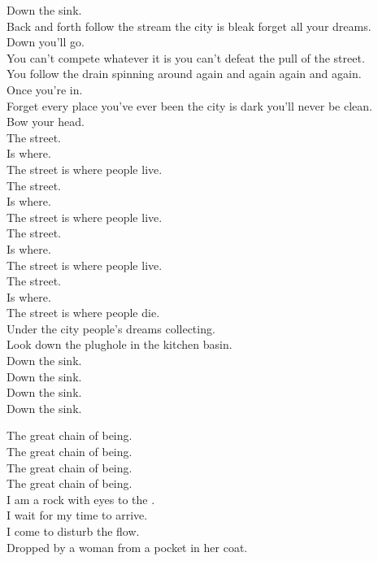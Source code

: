 Down the sink. \\
Back and forth follow the stream the city is bleak forget all your dreams. \\
Down you'll go. \\
You can't compete whatever it is you can't defeat the pull of the street. \\
You follow the drain spinning around again and again again and again. \\
Once you're in. \\
Forget every place you've ever been the city is dark you'll never be clean. \\
Bow your head. \\

The street. \\
Is where. \\
The street is where people live. \\
The street. \\
Is where. \\
The street is where people live. \\
The street. \\
Is where. \\
The street is where people live. \\
The street. \\
Is where. \\
The street is where people die. \\

Under the city people's dreams collecting. \\
Look down the plughole in the kitchen basin. \\

Down the sink. \\
Down the sink. \\
Down the sink. \\
Down the sink. \\




The great chain of being. \\
The great chain of being. \\
The great chain of being. \\
The great chain of being. \\

I am a rock with eyes to the . \\
I wait for my time to arrive. \\
I come to disturb the flow. \\
Dropped by a woman from a pocket in her coat. \\

